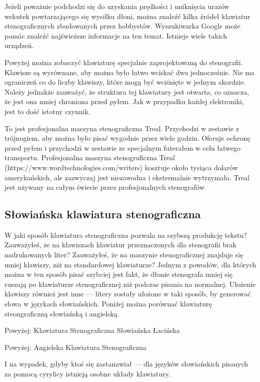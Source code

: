 \documentclass[12p, oneside]{book}
\begin{document}
Jeżeli poważnie podchodzi się do uzyskania prędkości i uniknięcia urazów wskutek powtarzającego się wysiłku dłoni, można znaleźć kilka źródeł klawiatur stenograficznych zbudowanych przez hobbystów. Wyszukiwarka Google może pomóc znaleźć najświeższe informacje na ten temat. Istnieje wiele takich urządzeń.

Powyżej można zobaczyć klawiaturę specjalnie zaprojektowaną do stenografii. Klawisze są wyrównane, aby można było łatwo wciskać dwa jednocześnie. Nie ma ograniczeń co do liczby klawiszy, które mogą być wciśnięte w jednym akordzie. Należy jednakże zauważyć, że struktura tej klawiatury jest otwarta, co oznacza, że jest ona mniej chroniona przed pyłem. Jak w przypadku każdej elektroniki, jest to dość istotny czynnik.

To jest profesjonalna maszyna stenograficzna Treal. Przychodzi w zestawie z trójnogiem, aby można było pisać wygodnie przez wiele godzin. Oferuje ochronę przed pyłem i przychodzi w zestawie ze specjalnym futerałem w celu łatwego transportu. Profesjonalna maszyna stenograficzna Treal (https://www.wordtechnologies.com/writers) kosztuje około tysiąca dolarów amerykańskich, ale zazwyczaj jest niezawodna i ekstremalnie wytrzymała. Treal jest używany na całym świecie przez profesjonalnych stenografów.

\subsection{Słowiańska klawiatura stenograficzna}
W jaki sposób klawiatura stenograficzna pozwala na szybszą produkcję tekstu? Zauważyłeś, że na klawiszach klawiatur przeznaczonych dla stenografii brak nadrukowanych liter? Zauważyłeś, że na maszynie stenograficznej znajduje się mniej klawiszy, niż na standardowej klawiaturze? Jednym z powodów, dla których można w ten sposób pisać szybciej jest fakt, że dłonie stenografa mniej się ruszają po klawiaturze stenograficznej niż podczas pisania na normalnej. Ułożenie klawiszy również jest inne --- litery zostały ułożone w taki sposób, by generować słowa w językach słowiańskich. Poniżej można porównać klawiaturę steongraficzną słowiańską i angielską.

Powyżej: Klawiatura Stenograficzna Słowiańska Łacińska

Powyżej: Angielska Klawiatura Stenograficzna

I na wypadek, gdyby ktoś się zastanawiał --- dla języków słowiańskich pisanych za pomocą cyrylicy istnieją osobne układy klawiatury.
\end{document}
